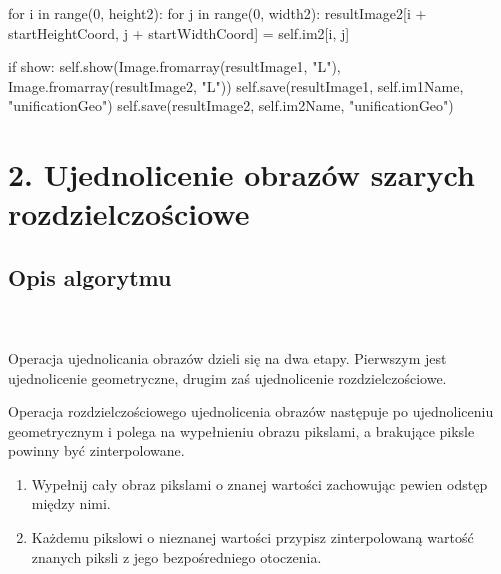 \documentclass[final,a4paper,openany,12pt]{mwbk}
\begin{document}
for i in range(0, height2):\newline
\indent for j in range(0, width2):\newline
\indent resultImage2[i + startHeightCoord, j + startWidthCoord] = self.im2[i, j]\newline

if show:\newline
\indent self.show(Image.fromarray(resultImage1, "L"), Image.fromarray(resultImage2, "L"))\newline
\indent self.save(resultImage1, self.im1Name, "unificationGeo")\newline
\indent self.save(resultImage2, self.im2Name, "unificationGeo")\newline

\newpage





\section*{2. Ujednolicenie obrazów szarych rozdzielczościowe}
\subsection*{Opis algorytmu}
\hfill
\\\\
\indent 
Operacja ujednolicania obrazów dzieli się na dwa etapy. Pierwszym jest ujednolicenie geometryczne, drugim zaś ujednolicenie rozdzielczościowe.

Operacja rozdzielczościowego ujednolicenia obrazów następuje po ujednoliceniu geometrycznym i polega na wypełnieniu obrazu pikslami, a brakujące piksle powinny być zinterpolowane.
\begin{enumerate}
	\item Wypełnij cały obraz pikslami o znanej wartości zachowując pewien odstęp między nimi.
	\item Każdemu pikslowi o nieznanej wartości przypisz zinterpolowaną wartość znanych piksli z jego bezpośredniego otoczenia.
\end{enumerate}
\end{document}
